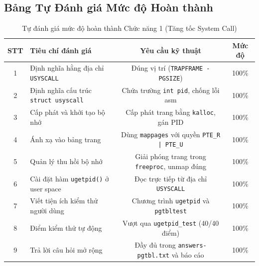 \subsection{Bảng Tự Đánh giá Mức độ Hoàn thành}
\begin{table}[h!]
    \centering
    \caption{Tự đánh giá mức độ hoàn thành Chức năng 1 (Tăng tốc System Call)}
    \label{tab:self_eval_ugetpid}
    \begin{tabularx}{\textwidth}{c X c c}
        \toprule
        \textbf{STT} & \textbf{Tiêu chí đánh giá} & \textbf{Yêu cầu kỹ thuật} & \textbf{Mức độ} \\
        \midrule
        1 & Định nghĩa hằng địa chỉ \texttt{USYSCALL} & Đúng vị trí (\texttt{TRAPFRAME - PGSIZE}) & 100\% \\
        2 & Định nghĩa cấu trúc \texttt{struct usyscall} & Chứa trường \texttt{int pid}, chống lỗi asm & 100\% \\
        3 & Cấp phát và khởi tạo bộ nhớ & Cấp phát trang bằng \texttt{kalloc}, gán PID & 100\% \\
        4 & Ánh xạ vào bảng trang & Dùng \texttt{mappages} với quyền \texttt{PTE\_R | PTE\_U} & 100\% \\
        5 & Quản lý thu hồi bộ nhớ & Giải phóng trang trong \texttt{freeproc}, unmap đúng & 100\% \\
        6 & Cài đặt hàm \texttt{ugetpid()} ở user space & Đọc trực tiếp từ địa chỉ \texttt{USYSCALL} & 100\% \\
        7 & Viết tiện ích kiểm thử người dùng & Chương trình \texttt{ugetpid} và \texttt{pgtbltest} & 100\% \\
        8 & Điểm kiểm thử tự động & Vượt qua \texttt{ugetpid\_test} (40/40 điểm) & 100\% \\
        9 & Trả lời câu hỏi mở rộng & Đầy đủ trong \texttt{answers-pgtbl.txt} và báo cáo & 100\% \\
        \bottomrule
    \end{tabularx}
\end{table}
